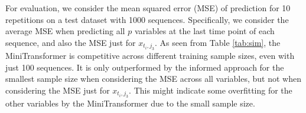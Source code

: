 \documentclass[AMA,Times1COL]{WileyNJDv5} %
\begin{document}

For evaluation, we consider the mean squared error (MSE) of prediction for 10 repetitions on a test dataset with 1000 sequences. Specifically, we consider the average MSE when predicting all $p$ variables at the last time point of each sequence, and also the MSE just for $x_{t_i,j_3}$. As seen from Table \ref{tab:sim}, the MiniTransformer is competitive across different training sample sizes, even with just 100 sequences. It is only outperformed by the informed approach for the smallest sample size when considering the MSE across all variables, but not when considering the MSE just for $x_{t_i,j_3}$. This might indicate some overfitting for the other variables by the MiniTransformer due to the small sample size.
\end{document}

